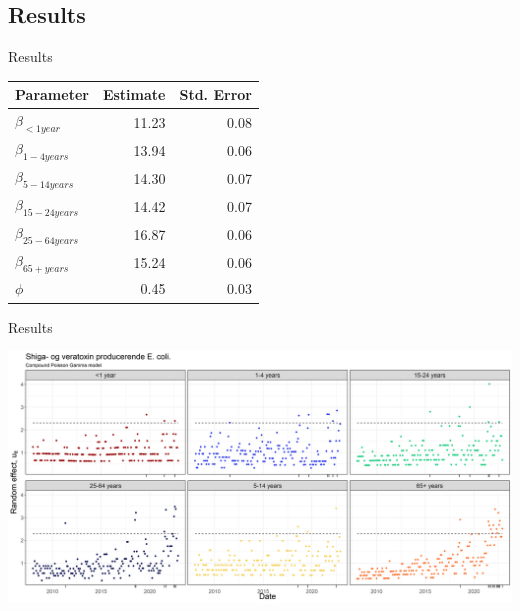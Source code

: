 \documentclass[aspectratio=169]{beamer}
\begin{document}
\hypertarget{results-2}{%
\subsection{Results}\label{results-2}}

\begin{frame}{Results}
\tiny

\begin{table}
\centering\begingroup\fontsize{10}{12}\selectfont

\begin{tabular}{lrr}
\toprule
Parameter & Estimate & Std. Error\\
\midrule
$\beta_{<1 year}$ & 11.23 & 0.08\\
$\beta_{1-4 years}$ & 13.94 & 0.06\\
$\beta_{5-14 years}$ & 14.30 & 0.07\\
$\beta_{15-24 years}$ & 14.42 & 0.07\\
$\beta_{25-64 years}$ & 16.87 & 0.06\\
$\beta_{65+ years}$ & 15.24 & 0.06\\
$\phi$ & 0.45 & 0.03\\
\bottomrule
\end{tabular}
\endgroup{}
\end{table}

\normalsize
\end{frame}

\begin{frame}{Results}
\protect\hypertarget{results-3}{}
\tiny

\includegraphics[width=1\linewidth]{../figures/PoisGxSTEC}

\normalsize
\end{frame}
\end{document}
